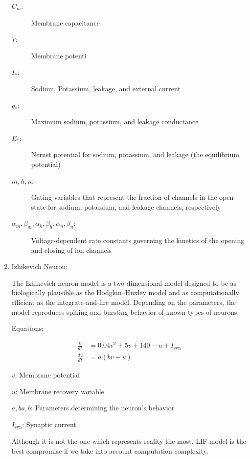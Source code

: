 \documentclass[11pt]{article}
\begin{document}
\begin{enumerate}
        \begin{flushleft}
          \begin{description}
            \item[$C_m$:] Membrane capacitance
            \item[$V$:] Membrane potenti
            \item[$I_{\text{*}}$:] Sodium, Potassium, leakage, and external current
            \item[$g_{\text{*}}$:] Maximum sodium, potassium, and leakage conductance
            \item[$E_{\text{*}}$:] Nernst potential for sodium, potassium, and leakage (the equilibrium potential)
            \item[$m, h, n$:] Gating variables that represent the fraction of channels in the open state for sodium, potassium, and leakage channels, respectively
            \item[$\alpha_m, \beta_m, \alpha_h, \beta_h, \alpha_n, \beta_n$:] Voltage-dependent rate constants governing the kinetics of the opening and closing of ion channels
          \end{description}
        \end{flushleft}



  \item Izhikevich Neuron:

        The Izhikevich neuron model \cite{izhi_model} is a two-dimensional model designed to be as biologically plausible as the Hodgkin–Huxley model and as computationally efficient as the integrate-and-fire model. Depending on the parameters, the model reproduces spiking and bursting behavior of known types of neurons.

        Equations:

        \begin{align*}
          \frac{dv}{dt} & = 0.04v^2 + 5v + 140 - u + I_{\text{syn}} \\
          \frac{du}{dt} & = a(bv - u)
        \end{align*}


        $v$: Membrane potential

        $u$: Membrane recovery variable

        $a,ba,b$: Parameters determining the neuron's behavior

        $I_{\text{syn}}$: Synaptic current


        Although it is not the one which represents reality the most, LIF model is the best compromise if we take into account computation complexity.


\end{enumerate}
\end{document}
